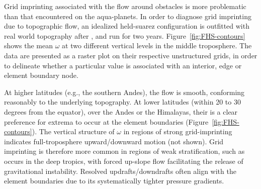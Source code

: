 \documentclass[twocol]{ametsoc}
\begin{document}
Grid imprinting associated with the flow around obstacles is more problematic than that encountered on the aqua-planets. In order to diagnose grid imprinting due to topographic flow, an idealized held-suarez configuration \citep{HS1994} is outfitted with real world topography after \cite{FRETAL2000WMR,BETAL2006MWR}, and run for two years. Figure~\ref{fig:FHS-contours} shows the mean $\omega$ at two different vertical levels in the middle troposphere. {\color{red}The data are presented as a raster plot on their respective unstructured grids, in order to delineate whether a particular value is associated with an interior, edge or element boundary node.{}} 

At higher latitudes (e.g., the southern Andes), the flow is smooth, conforming reasonably to the underlying topography. At lower latitudes (within 20 to 30 degrees from the equator), over the Andes or the Himalayas, their is a clear preference for extrema to occur at the element boundaries (Figure~\ref{fig:FHS-contours}). The vertical structure of $\omega$ in regions of strong grid-imprinting indicates full-troposphere upward/downward motion (not shown). Grid imprinting is therefore more common in regions of weak stratification, such as occurs in the deep tropics, with forced up-slope flow facilitating the release of gravitational instability. Resolved updrafts/downdrafts often align with the element boundaries due to its systematically tighter pressure gradients. 
\end{document}

